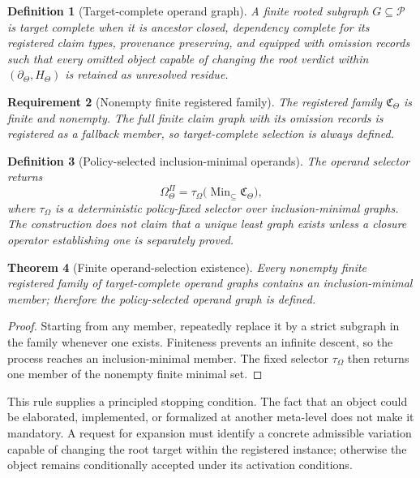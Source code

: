 \documentclass[10pt]{article}
\newtheorem{definition}{Definition}[section]
\newtheorem{theorem}[definition]{Theorem}
\newtheorem{requirement}[definition]{Requirement}
\newcommand{\Operands}{\Omega}
\newcommand{\Target}{\Theta}
\begin{document}
\begin{definition}[Target-complete operand graph]
A finite rooted subgraph $G\subseteq\mathcal P$ is target complete when it is ancestor closed, dependency complete for its registered claim types, provenance preserving, and equipped with omission records such that every omitted object capable of changing the root verdict within $(\partial_\Target,H_\Target)$ is retained as unresolved residue.
\end{definition}

\begin{requirement}[Nonempty finite registered family]
The registered family $\mathfrak C_\Target$ is finite and nonempty.  The full finite claim graph with its omission records is registered as a fallback member, so target-complete selection is always defined.
\end{requirement}

\begin{definition}[Policy-selected inclusion-minimal operands]
The operand selector returns
\[
  \Operands_\Target^{\Pi}=\tau_\Omega
  \bigl(\operatorname{Min}_{\subseteq}\mathfrak C_\Target\bigr),
\]
where $\tau_\Omega$ is a deterministic policy-fixed selector over inclusion-minimal graphs.  The construction does not claim that a unique least graph exists unless a closure operator establishing one is separately proved.
\end{definition}

\begin{theorem}[Finite operand-selection existence]\label{thm:operand-selection}
Every nonempty finite registered family of target-complete operand graphs contains an inclusion-minimal member; therefore the policy-selected operand graph is defined.
\end{theorem}

\begin{proof}
Starting from any member, repeatedly replace it by a strict subgraph in the family whenever one exists.  Finiteness prevents an infinite descent, so the process reaches an inclusion-minimal member.  The fixed selector $\tau_\Omega$ then returns one member of the nonempty finite minimal set.
\end{proof}

This rule supplies a principled stopping condition.  The fact that an object could be elaborated, implemented, or formalized at another meta-level does not make it mandatory.  A request for expansion must identify a concrete admissible variation capable of changing the root target within the registered instance; otherwise the object remains conditionally accepted under its activation conditions.
\end{document}
